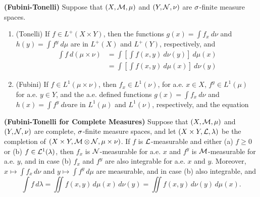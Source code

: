 \vs

\begin{thm}\textbf{(Fubini-Tonelli)}
Suppose that $(X, \mathcal{M}, \mu)$ and $(Y, \mathcal{N}, \nu)$ are $\sigma$-finite measure spaces.
\begin{enumerate}
    \item (Tonelli) If $f\in L^+(X\times Y)$, then the functions $g(x) = \int f_x\ d\nu$ and $h(y) = \int f^y\  d\mu$ are in $L^+(X)$ and $L^+(Y)$, respectively, and
    \begin{align*}
    \int f\ d(\mu\times \nu) &= \int \left[\int f(x,y)\ d\nu(y) \right]\ d\mu(x)\\
    &= \int\left[ \int f(x,y)\ d\mu(x)\right] \ d\nu(y)
    \end{align*}
    
    \item (Fubini) If $f\in L^1(\mu \times \nu)$, then $f_x\in L^1(\nu)$, for a.e. $x\in X$, $f^y\in L^1(\mu)$ for a.e. $y\in Y$, and the a.e. defined functions $g(x) = \int f_x\ d\nu$ and $h(x) = \int f^y\ d\nu$are in $L^1(\mu)$ and $L^1(\nu)$, respectively, and the equation 
\end{enumerate}
\end{thm}

\vs

\setcounter{thm}{38}

\begin{thm}\textbf{(Fubini-Tonelli for Complete Measures)}
Suppose that $(X, \mathcal{M}, \mu)$ and $(Y, \mathcal{N}, \nu)$ are complete, $\sigma$-finite measure spaces, and let $(X\times Y, \mathcal{L}, \lambda)$ be the completion of $(X\times Y, \mathcal{M}\otimes \mathcal{N}, \mu\times \nu)$. If $f$ is $\mathcal{L}$-measurable and either (a) $f\geq 0$ or (b) $ f\in \mathcal{L}^1(\lambda)$, then $f_x$ is $\mathcal{N}$-measurable for a.e. $x$ and $f^y$ is $\mathcal{M}$-measurable for a.e. $y$, and in case (b) $f_x$ and $f^y$ are also integrable for a.e. $x$ and $y$. Moreover, $x\mapsto \int f_x\,d\nu$ and $y\mapsto \int f^y\,d\mu$ are measurable, and in case (b) also integrable, and
\[\int f\,d\lambda = \iint f(x,y)\,d\mu(x)\,d\nu(y) = \iint f(x,y)\,d\nu(y)\,d\mu(x).\]
\end{thm}









